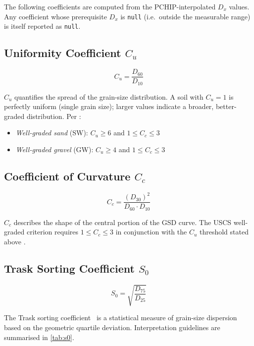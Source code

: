 \documentclass[12pt,a4paper]{article}
\begin{document}
The following coefficients are computed from the PCHIP-interpolated $D_x$
values.  Any coefficient whose prerequisite $D_x$ is \texttt{null}
(i.e.\ outside the measurable range) is itself reported as \texttt{null}.

\subsection{Uniformity Coefficient \texorpdfstring{$C_u$}{Cu}}

\begin{equation}
    C_u = \frac{D_{60}}{D_{10}}
    \label{eq:cu}
\end{equation}

$C_u$ quantifies the spread of the grain-size distribution.  A soil with
$C_u = 1$ is perfectly uniform (single grain size); larger values indicate
a broader, better-graded distribution.  Per \citet{astm_d2487}:
\begin{itemize}
    \item \emph{Well-graded sand} (SW): $C_u \ge 6$ and $1 \le C_c \le 3$
    \item \emph{Well-graded gravel} (GW): $C_u \ge 4$ and $1 \le C_c \le 3$
\end{itemize}

\subsection{Coefficient of Curvature \texorpdfstring{$C_c$}{Cc}}

\begin{equation}
    C_c = \frac{(D_{30})^2}{D_{60} \cdot D_{10}}
    \label{eq:cc}
\end{equation}

$C_c$ describes the shape of the central portion of the GSD curve.  The
USCS well-graded criterion requires $1 \le C_c \le 3$ in conjunction with
the $C_u$ threshold stated above \citep{astm_d2487}.

\subsection{Trask Sorting Coefficient \texorpdfstring{$S_0$}{S0}}

\begin{equation}
    S_0 = \sqrt{\frac{D_{75}}{D_{25}}}
    \label{eq:s0}
\end{equation}

The Trask sorting coefficient~\citep{trask1932} is a statistical measure of
grain-size dispersion based on the geometric quartile deviation.  Interpretation
guidelines are summarised in \cref{tab:s0}.
\end{document}
